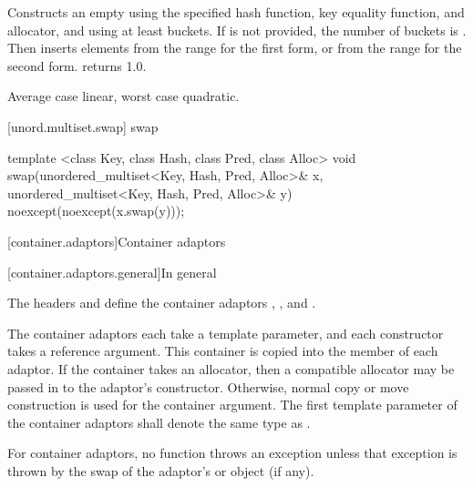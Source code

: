 \begin{itemdescr}
\pnum\effects
Constructs an empty  using the
specified hash function, key equality function, and allocator, and
using at least  buckets. If  is not
provided, the number of buckets is . Then
inserts elements from the range 
for the first form, or from the range
 for the second form.
 returns 1.0.

\pnum\complexity Average case linear, worst case quadratic.
\end{itemdescr}

[unord.multiset.swap]{ swap}

%
%
\begin{itemdecl}
template <class Key, class Hash, class Pred, class Alloc>
  void swap(unordered_multiset<Key, Hash, Pred, Alloc>& x,
            unordered_multiset<Key, Hash, Pred, Alloc>& y)
    noexcept(noexcept(x.swap(y)));
\end{itemdecl}

\begin{itemdescr}
\pnum\effects {}
\end{itemdescr}


[container.adaptors]{Container adaptors}

[container.adaptors.general]{In general}

\pnum
The headers  and  define the container adaptors
, , and .

\pnum
The container adaptors each take a  template parameter, and each constructor takes
a  reference argument. This container is copied into the  member
of each adaptor. If the container takes an allocator, then a compatible allocator may be passed in
to the adaptor's constructor. Otherwise, normal copy or move construction is used for the container
argument.
The first template parameter  of the container adaptors
shall denote the same type as .

\pnum
For container adaptors, no  function throws an exception unless that
exception is thrown by the swap of the adaptor's  or
 object (if any).


